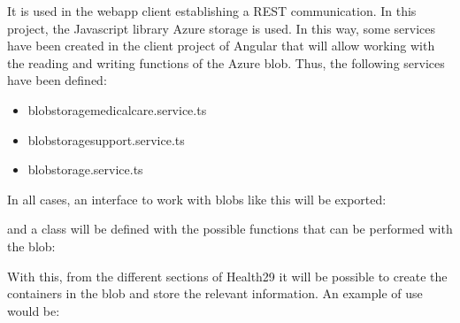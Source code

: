 \documentclass[letterpaper,10pt,english]{sphinxmanual}
\begin{document}
It is used in the webapp client establishing a REST communication.
In this project, the Javascript library Azure storage is used. In this way, some services have been created in the client project of Angular that will allow working with the reading and writing functions of the Azure blob.
Thus, the following services have been defined:
\begin{itemize}
\item {} 
blob\sphinxhyphen{}storage\sphinxhyphen{}medical\sphinxhyphen{}care.service.ts

\item {} 
blob\sphinxhyphen{}storage\sphinxhyphen{}support.service.ts

\item {} 
blob\sphinxhyphen{}storage.service.ts

\end{itemize}

In all cases, an interface to work with blobs like this will be exported:

\begin{sphinxVerbatim}[commandchars=\\\{\}]
   
   
   
   
    
\end{sphinxVerbatim}

and a class will be defined with the possible functions that can be performed with the blob:

\begin{sphinxVerbatim}[commandchars=\\\{\}]
  
\end{sphinxVerbatim}

With this, from the different sections of Health29 it will be possible to create the containers in the blob and store the relevant information.
An example of use would be:

\begin{sphinxVerbatim}[commandchars=\\\{\}]
    
    
\end{sphinxVerbatim}
\end{document}
